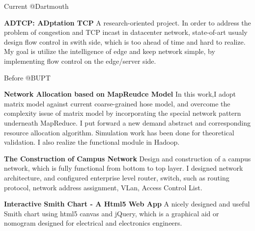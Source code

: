 \documentclass{tccv}
\begin{document}
\begin{eventlist}

\item{Current}
     {@Dartmouth}
     {}
     
     \textbf{ADTCP: ADptation TCP}\newline
     A research-oriented project. In order to address the problem of congestion and TCP incast in datacenter network, state-of-art usualy design flow control in swith side, which is too ahead of time and hard to realize. My goal is utilize the intelligence of edge and keep network simple, by implementing flow control on the edge/server side.

\item{Before}
     {@BUPT}
     {}
     
     \textbf{Network Allocation based on MapReudce Model}\newline
     In this work,I adopt matrix model against current coarse-grained hose model, and overcome the complexity issue of matrix model by incorporating the special network pattern underneath MapReduce. I put forward a new demand abstract and corresponding resource allocation algorithm. Simulation work has been done for theoretical validation. I also realize the functional module in Hadoop.\newline
     
     
     \textbf{The Construction of Campus Network}\newline
     Design and construction of a campus network, which is fully functional from bottom to top layer. I designed network architecture, and configured enterprise level router, switch, such as routing protocol, network address assignment, VLan, Access Control List.\newline

     \textbf{Interactive Smith Chart - A Html5 Web App}\newline
     A nicely designed and useful Smith chart using html5 canvas and jQuery, which is a graphical aid or nomogram designed for electrical and electronics engineers.\newline


\end{eventlist}
\end{document}
